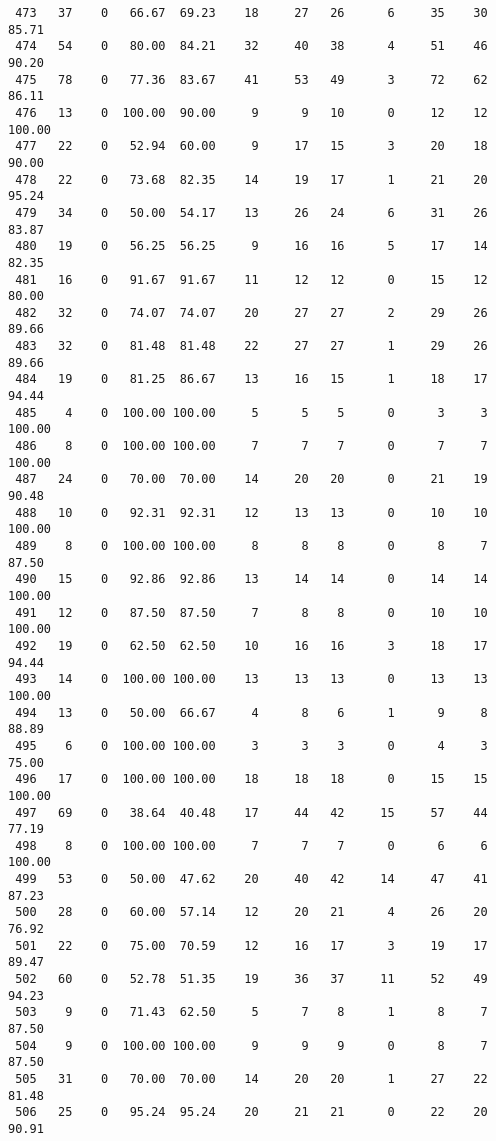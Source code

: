 \begin{verbatim}
 473   37    0   66.67  69.23    18     27   26      6     35    30    85.71
 474   54    0   80.00  84.21    32     40   38      4     51    46    90.20
 475   78    0   77.36  83.67    41     53   49      3     72    62    86.11
 476   13    0  100.00  90.00     9      9   10      0     12    12   100.00
 477   22    0   52.94  60.00     9     17   15      3     20    18    90.00
 478   22    0   73.68  82.35    14     19   17      1     21    20    95.24
 479   34    0   50.00  54.17    13     26   24      6     31    26    83.87
 480   19    0   56.25  56.25     9     16   16      5     17    14    82.35
 481   16    0   91.67  91.67    11     12   12      0     15    12    80.00
 482   32    0   74.07  74.07    20     27   27      2     29    26    89.66
 483   32    0   81.48  81.48    22     27   27      1     29    26    89.66
 484   19    0   81.25  86.67    13     16   15      1     18    17    94.44
 485    4    0  100.00 100.00     5      5    5      0      3     3   100.00
 486    8    0  100.00 100.00     7      7    7      0      7     7   100.00
 487   24    0   70.00  70.00    14     20   20      0     21    19    90.48
 488   10    0   92.31  92.31    12     13   13      0     10    10   100.00
 489    8    0  100.00 100.00     8      8    8      0      8     7    87.50
 490   15    0   92.86  92.86    13     14   14      0     14    14   100.00
 491   12    0   87.50  87.50     7      8    8      0     10    10   100.00
 492   19    0   62.50  62.50    10     16   16      3     18    17    94.44
 493   14    0  100.00 100.00    13     13   13      0     13    13   100.00
 494   13    0   50.00  66.67     4      8    6      1      9     8    88.89
 495    6    0  100.00 100.00     3      3    3      0      4     3    75.00
 496   17    0  100.00 100.00    18     18   18      0     15    15   100.00
 497   69    0   38.64  40.48    17     44   42     15     57    44    77.19
 498    8    0  100.00 100.00     7      7    7      0      6     6   100.00
 499   53    0   50.00  47.62    20     40   42     14     47    41    87.23
 500   28    0   60.00  57.14    12     20   21      4     26    20    76.92
 501   22    0   75.00  70.59    12     16   17      3     19    17    89.47
 502   60    0   52.78  51.35    19     36   37     11     52    49    94.23
 503    9    0   71.43  62.50     5      7    8      1      8     7    87.50
 504    9    0  100.00 100.00     9      9    9      0      8     7    87.50
 505   31    0   70.00  70.00    14     20   20      1     27    22    81.48
 506   25    0   95.24  95.24    20     21   21      0     22    20    90.91

\end{verbatim}

